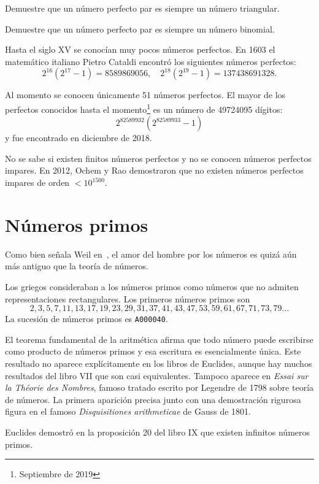 \begin{exercise}
	Demuestre que un número perfecto par es siempre un número triangular. 
\end{exercise}

\begin{exercise}
	Demuestre que un número perfecto par es siempre un número binomial.
\end{exercise}

Hasta el siglo XV se conocían muy pocos números perfectos.  En 1603 el
matemático italiano Pietro Cataldi encontró los siguientes números perfectos: 
\[
	2^{16}(2^{17} - 1) = 8 589 869 056,\quad
	2^{18}(2^{19} - 1)= 137 438691 328. 
\] 

Al momento se conocen únicamente 51 números perfectos. El mayor de los
perfectos conocidos hasta el momento\footnote{Septiembre de 2019} es un número
de 49724095 dígitos:
\[
	2^{82 589 932} (2^{82 589 933} - 1)
\]
y fue encontrado en diciembre de 2018.

No se sabe si existen finitos números perfectos y no se conocen números
perfectos impares.  En 2012, Ochem y Rao demostraron que no existen números
perfectos impares de orden $<10^{1500}$. 

\section*{Números primos}

Como bien señala Weil en~\cite{MR734177}, el amor del hombre por los números es
quizá aún más antiguo que la teoría de números.  

Los griegos consideraban a los números primos como números que no admiten
representaciones rectangulares.  Los primeros números primos son
\[
    2, 3, 5, 7, 11, 13, 17, 19, 23, 29, 31, 37, 41, 43, 47, 53, 59, 61, 67, 71, 73, 79\dots
\]
La sucesión de números primos es \verb+A000040+. 

El teorema fundamental de la aritmética afirma que todo número puede escribirse
como producto de números primos y esa escritura es esencialmente única. Este
resultado no aparece explícitamente en los libros de Euclides, aunque hay
muchos resultados del libro VII que son casi equivalentes. Tampoco aparece en
\emph{Essai sur la Théorie des Nombres}, famoso tratado escrito por Legendre de
1798 sobre teoría de números. La primera aparición precisa junto con una
demostración rigurosa figura en el famoso \emph{Disquisitiones arithmeticae} de
Gauss de 1801. 

Euclides demostró en la proposición 20 del libro IX que existen infinitos
números primos. 


